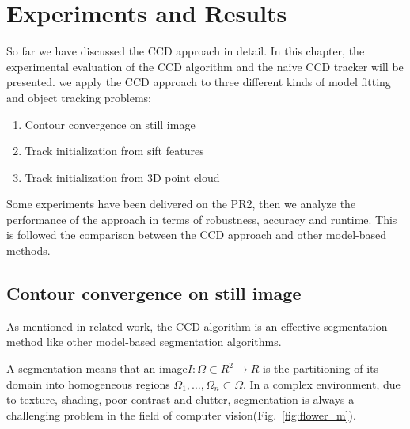 \chapter{Experiments and Results}
\label{chapter:experiments}

So far we have discussed the CCD approach in detail. In this chapter,
the experimental evaluation of the CCD algorithm and the naive CCD
tracker will be presented. we apply the CCD approach to three
different kinds of model fitting and object tracking problems:

\begin{enumerate}
\item Contour convergence on still image
\item Track initialization from sift features
\item Track initialization from 3D point cloud
\end{enumerate}

Some experiments have been delivered on the PR2, then we analyze the performance
of the approach in terms of robustness, accuracy and runtime. This is
followed the comparison between the CCD approach and  other
model-based methods.



\section{Contour convergence on still image}
\label{sec:ES}

As mentioned in related work, the CCD algorithm is an effective
segmentation method like other model-based segmentation algorithms.

A segmentation means that an image$I: \Omega \subset R^2 \longrightarrow R$
is the partitioning of its domain into homogeneous regions
$\Omega_1,\ldots, \Omega_n \subset \Omega$. In a complex environment,
due to texture, shading, poor contrast and clutter, segmentation is
always a challenging problem in the field of computer
vision(Fig.~\ref{fig:flower_m}).

